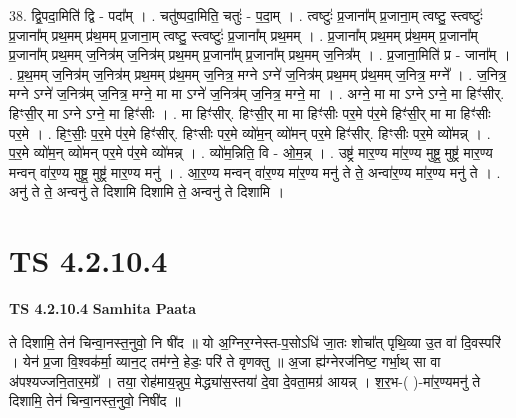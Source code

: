 \documentclass[17pt]{extarticle}
\begin{document}
38. द्वि॒पदा॒मिति॑ द्वि - पदा᳚म् । . चतु॑ष्पदा॒मिति॒ चतुः॑ - प॒दा॒म् । . त्वष्टुः॑ प्र॒जाना᳚म् प्र॒जाना॒म् त्वष्टु॒ स्त्वष्टुः॑ प्र॒जाना᳚म् प्रथ॒मम् प्र॑थ॒मम् प्र॒जाना॒म् त्वष्टु॒ स्त्वष्टुः॑ प्र॒जाना᳚म् प्रथ॒मम् । . प्र॒जाना᳚म् प्रथ॒मम् प्र॑थ॒मम् प्र॒जाना᳚म् प्र॒जाना᳚म् प्रथ॒मम् ज॒नित्र॑म् ज॒नित्र॑म् प्रथ॒मम् प्र॒जाना᳚म् प्र॒जाना᳚म् प्रथ॒मम् ज॒नित्र᳚म् । . प्र॒जाना॒मिति॑ प्र - जाना᳚म् । . प्र॒थ॒मम् ज॒नित्र॑म् ज॒नित्र॑म् प्रथ॒मम् प्र॑थ॒मम् ज॒नित्र॒ मग्ने ऽग्ने॑ ज॒नित्र॑म् प्रथ॒मम् प्र॑थ॒मम् ज॒नित्र॒ मग्ने᳚ । . ज॒नित्र॒ मग्ने ऽग्ने॑ ज॒नित्र॑म् ज॒नित्र॒ मग्ने॒ मा मा ऽग्ने॑ ज॒नित्र॑म् ज॒नित्र॒ मग्ने॒ मा । . अग्ने॒ मा मा ऽग्ने ऽग्ने॒ मा हिꣳ॑सीर्. हिꣳसी॒र् मा ऽग्ने ऽग्ने॒ मा हिꣳ॑सीः । . मा हिꣳ॑सीर्. हिꣳसी॒र् मा मा हिꣳ॑सीः पर॒मे प॑र॒मे हिꣳ॑सी॒र् मा मा हिꣳ॑सीः पर॒मे । . हिꣳ॒॒सीः॒ प॒र॒मे प॑र॒मे हिꣳ॑सीर्. हिꣳसीः पर॒मे व्यो॑म॒न् व्यो॑मन् पर॒मे हिꣳ॑सीर्. हिꣳसीः पर॒मे व्यो॑मन्न् । . प॒र॒मे व्यो॑म॒न् व्यो॑मन् पर॒मे प॑र॒मे व्यो॑मन्न् । . व्यो॑म॒न्निति॒ वि - ओ॒म॒न्न् । . उष्ट्र॑ मार॒ण्य मा॑र॒ण्य मुष्ट्र॒ मुष्ट्र॑ मार॒ण्य मन्वन् वा॑र॒ण्य मुष्ट्र॒ मुष्ट्र॑ मार॒ण्य मनु॑ । . आ॒र॒ण्य मन्वन् वा॑र॒ण्य मा॑र॒ण्य मनु॑ ते ते॒ अन्वा॑र॒ण्य मा॑र॒ण्य मनु॑ ते । . अनु॑ ते ते॒ अन्वनु॑ ते दिशामि दिशामि ते॒ अन्वनु॑ ते दिशामि । \newline
\pagebreak
{}

\section{ TS 4.2.10.4 }

\textbf{TS 4.2.10.4 } \newline
\textbf{Samhita Paata} \newline

ते दिशामि॒ तेन॑ चिन्वा॒नस्त॒नुवो॒ नि षी॑द ॥ यो अ॒ग्निर॒ग्नेस्त-प॒सोऽधि॑ जा॒तः शोचा᳚त् पृथि॒व्या उ॒त वा॑ दि॒वस्परि॑ । येन॑ प्र॒जा वि॒श्वक॑र्मा॒ व्यान॒ट् तम॑ग्ने॒ हेडः॒ परि॑ ते वृणक्तु ॥ अ॒जा ह्य॑ग्नेरज॑निष्ट॒ गर्भा॒थ् सा वा अ॑पश्यज्जनि॒तार॒मग्रे᳚ । तया॒ रोह॑माय॒न्नुप॒ मेद्ध्या॑स॒स्तया॑ दे॒वा दे॒वता॒मग्र॑ आयन्न् । श॒र॒भ-( )-मा॑र॒ण्यमनु॑ ते दिशामि॒ तेन॑ चिन्वा॒नस्त॒नुवो॒ निषी॑द ॥ \newline
\end{document}
